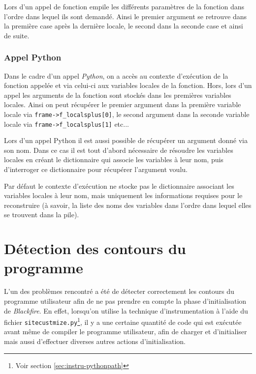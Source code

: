\begin{note}
Lors d'un appel de fonction \Python empile les différents paramètres de la fonction dans l'ordre dans lequel ils sont demandé. Ainsi le premier argument se retrouve dans la première case après la dernière locale, le second dans la seconde case et ainsi de suite.
\end{note}

\subsubsection*{Appel Python}
Dans le cadre d'un appel \emph{Python}, on a accès au contexte d'exécution de la fonction appelée et via celui-ci aux variables locales de la fonction. Hors, lors d'un appel \Python les arguments de la fonction sont stockés dans les premières variables locales. Ainsi on peut récupérer le premier argument dans la première variable locale via \verb|frame->f_localsplus[0]|, le second argument dans la seconde variable locale via \verb|frame->f_localsplus[1]| etc...

Lors d'un appel Python il est aussi possible de récupérer un argument donné via son nom. Dans ce cas il est tout d'abord nécessaire de résoudre les variables locales en créant le dictionnaire qui associe les variables à leur nom, puis d'interroger ce dictionnaire pour récupérer l'argument voulu.

\begin{note}
Par défaut le contexte d'exécution ne stocke pas le dictionnaire associant les variables locales à leur nom, mais uniquement les informations requises pour le reconstruire (à savoir, la liste des noms des variables dans l'ordre dans lequel elles se trouvent dans la pile).
\end{note}

  \section{Détection des contours du programme}

L'un des problèmes rencontré a été de détecter correctement les contours du \gls{programme utilisateur} afin de ne pas prendre en compte la phase d'initialisation de \emph{Blackfire}. En effet, lorsqu'on utilise la technique d'instrumentation à l'aide du fichier \verb|sitecustmize.py|\footnote{Voir section \vref{sec:instru-pythonpath}}, il y a une certaine quantité de code qui est exécutée avant même de compiler le programme utilisateur, afin de charger et d'initialiser \Blackfire mais aussi d'effectuer diverses autres actions d'initialisation.

